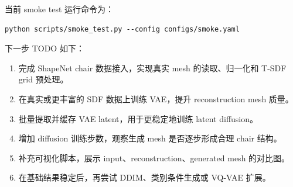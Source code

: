 \documentclass[UTF8,a4paper,12pt]{ctexart}
\begin{document}
当前 smoke test 运行命令为：
\begin{lstlisting}
python scripts/smoke_test.py --config configs/smoke.yaml
\end{lstlisting}

下一步 TODO 如下：
\begin{enumerate}
    \item 完成 ShapeNet chair 数据接入，实现真实 mesh 的读取、归一化和 T-SDF grid 预处理。
    \item 在真实或更丰富的 SDF 数据上训练 VAE，提升 reconstruction mesh 质量。
    \item 批量提取并缓存 VAE latent，用于更稳定地训练 latent diffusion。
    \item 增加 diffusion 训练步数，观察生成 mesh 是否逐步形成合理 chair 结构。
    \item 补充可视化脚本，展示 input、reconstruction、generated mesh 的对比图。
    \item 在基础结果稳定后，再尝试 DDIM、类别条件生成或 VQ-VAE 扩展。
\end{enumerate}
\end{document}

